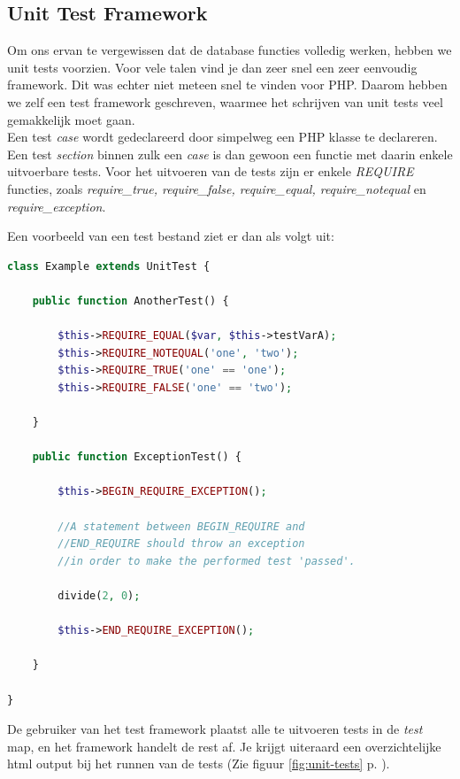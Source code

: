 \documentclass[11pt]{article}
\begin{document}
\subsection{Unit Test Framework}

Om ons ervan te vergewissen dat de database functies volledig werken, hebben we unit tests voorzien. Voor vele talen vind je dan zeer snel een zeer eenvoudig framework. Dit was echter niet meteen snel te vinden voor PHP. Daarom hebben we zelf een test framework geschreven, waarmee het schrijven van unit tests veel gemakkelijk moet gaan.\\

Een test \emph{case} wordt gedeclareerd door simpelweg een PHP klasse te declareren. Een test \emph{section} binnen zulk een \emph{case} is dan gewoon een functie met daarin enkele uitvoerbare tests.
Voor het uitvoeren van de tests zijn er enkele \emph{REQUIRE} functies, zoals \emph{require\_true, require\_false, require\_equal, require\_notequal} en \emph{require\_exception}.

Een voorbeeld van een test bestand ziet er dan als volgt uit:

\begin{framed}
\begin{lstlisting}[language=php]
class Example extends UnitTest {
	
	public function AnotherTest() {
		
		$this->REQUIRE_EQUAL($var, $this->testVarA);
		$this->REQUIRE_NOTEQUAL('one', 'two');
		$this->REQUIRE_TRUE('one' == 'one');
		$this->REQUIRE_FALSE('one' == 'two');
		
	}
	
	public function ExceptionTest() {
		
		$this->BEGIN_REQUIRE_EXCEPTION();

		//A statement between BEGIN_REQUIRE and
		//END_REQUIRE should throw an exception
		//in order to make the performed test 'passed'.
		
		divide(2, 0);
		
		$this->END_REQUIRE_EXCEPTION();
		
	}	
	
}
\end{lstlisting}
\end{framed}


De gebruiker van het test framework plaatst alle te uitvoeren tests in de \emph{test} map, en het framework handelt de rest af. Je krijgt uiteraard een overzichtelijke html output bij het runnen van de tests (Zie figuur \ref{fig:unit-tests} p. \pageref{fig:unit-tests}).
\end{document}
